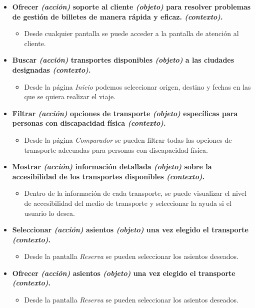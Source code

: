 \begin{itemize}
    \item \textbf{Ofrecer \textit{(acción)} soporte al cliente \textit{(objeto)} para resolver problemas de gestión de
        billetes de manera rápida y eficaz. \textit{(contexto)}.}
        \begin{itemize}
            \item Desde cualquier pantalla se puede acceder a la pantalla de atención al cliente.
        \end{itemize}

    \item \textbf{Buscar \textit{(acción)} transportes disponibles \textit{(objeto)} a las ciudades designadas \textit{(contexto)}.} 
        \begin{itemize}
            \item Desde la página \textit{Inicio} podemos seleccionar origen, destino y fechas en las que se quiera
                realizar el viaje.
        \end{itemize}

    \item \textbf{Filtrar \textit{(acción)} opciones de transporte \textit{(objeto)} específicas para personas con discapacidad
        física \textit{(contexto)}.}
        \begin{itemize}
            \item Desde la página \textit{Comparador} se pueden filtrar todas las opciones de transporte adecuadas para personas con
                discapacidad física.
        \end{itemize}

    \item \textbf{Mostrar \textit{(acción)} información detallada \textit{(objeto)} sobre la accesibilidad de los transportes 
        disponibles \textit{(contexto)}.}
        \begin{itemize}
            \item Dentro de la información de cada transporte, se puede visualizar el nivel de accesibilidad del medio de
                transporte y seleccionar la ayuda si el usuario lo desea.
        \end{itemize}

    \item \textbf{Seleccionar \textit{(acción)} asientos \textit{(objeto)} una vez elegido el transporte \textit{(contexto)}.}
        \begin{itemize}
            \item Desde la pantalla \textit{Reserva} se pueden seleccionar los asientos deseados.
        \end{itemize}

    \item \textbf{Ofrecer \textit{(acción)} asientos \textit{(objeto)} una vez elegido el transporte \textit{(contexto)}.}
        \begin{itemize}
            \item Desde la pantalla \textit{Reserva} se pueden seleccionar los asientos deseados.
        \end{itemize}
\end{itemize}


